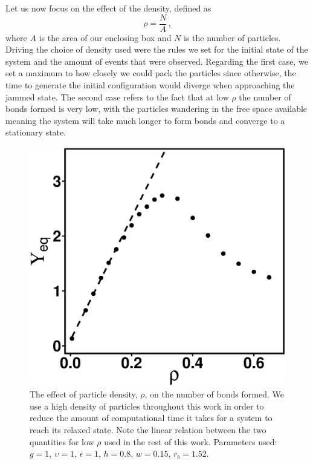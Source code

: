 \documentclass[../../main.tex]{subfiles}
\begin{document}
    Let us now focus on the effect of the density, defined as
        \begin{equation}\label{eq: Lennard-Jones - density}
            \rho = \frac{N}{A} \,,
        \end{equation}
    where $A$ is the area of our enclosing box and $N$ is the number of particles. Driving the choice of density used were the rules we set for the initial state of the system and the amount of events that were observed. Regarding the first case, we set a maximum to how closely we could pack the particles since otherwise, the time to generate the initial configuration would diverge when approaching the jammed state. The second case refers to the fact that at low $\rho$ the number of bonds formed is very low, with the particles wandering in the free space available meaning the system will take much longer to form bonds and converge to a stationary state.
        \begin{figure}[h]
            \centering
            \includegraphics[scale=0.4]{Figures/np2D_rho.eps}
            \caption{The effect of particle density, $\rho$, on the number of bonds formed. We use a high density of particles throughout this work in order to reduce the amount of computational time it takes for a system to reach its relaxed state. Note the linear relation between the two quantities for low $\rho$ used in the rest of this work. Parameters used: $g = 1$, $\upsilon = 1$, $\epsilon = 1$, $h = 0.8$, $w = 0.15$, $r_b = 1.52$.}
            \label{fig: np2D - rho}
        \end{figure}
    
\end{document}
